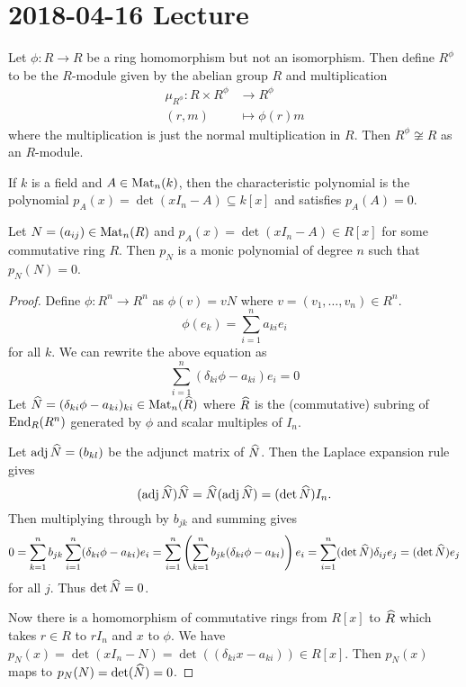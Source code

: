 \section{2018-04-16 Lecture}

\begin{exam}
	Let $\phi:R \to R$ be a ring homomorphism but not an isomorphism.
	Then define $R^\phi$ to be the $R$-module given by the abelian group $R$ and multiplication
	\begin{align*}
		\mu_{R^\phi}: R \times R^\phi &\to R^\phi \\
		(r,m) &\mapsto \phi(r)m
	\end{align*}
	where the multiplication is just the normal multiplication in $R$.
	Then $R^\phi \not\cong R$ as an $R$-module.
\end{exam}

If $k$ is a field and $A \in \operatorname{Mat}_n(k)$, then the characteristic polynomial is the polynomial $p_A(x) = \det(xI_n-A) \subseteq k[x]$ and satisfies $p_A(A)=0$.

\begin{thm}
	Let $N = (a_{ij}) \in \operatorname{Mat}_n(R)$ and $p_A(x) = \det(xI_n-A) \in R[x]$ for some commutative ring $R$.
	Then $p_N$ is a monic polynomial of degree $n$ such that $p_N(N)=0$.
\end{thm}

\begin{proof}
	Define $\phi: R^n \to R^n$ as $\phi(v)=vN$ where $v=(v_1,\ldots,v_n) \in R^n$.
	\[\phi(e_k) = \sum_{i=1}^n a_{ki}e_i\]
	for all $k$.
	We can rewrite the above equation as
	\[\sum_{i=1}^n (\delta_{ki}\phi-a_{ki})e_i=0\]
	Let $\widehat{N}=(\delta_{ki}\phi-a_{ki})_{ki} \in \operatorname{Mat}_n(\widehat R)$ where $\widehat R$ is the (commutative) subring of $\operatorname{End}_R(R^n)$ generated by $\phi$ and scalar multiples of $I_n$.

	Let $\operatorname{adj} \widehat N = (b_{kl})$ be the adjunct matrix of $\widehat N$.
	Then the Laplace expansion rule gives
	\[ (\operatorname{adj}\widehat N)\widehat N = \widehat N(\operatorname{adj}\widehat N) = (\det\widehat N) I_n.\]
	Then multiplying through by $b_{jk}$ and summing gives
	\[0 = \sum_{k=1}^n b_{jk} \sum_{i=1}^n (\delta_{ki}\phi-a_{ki})e_i = \sum_{i=1}^n \left( \sum_{k=1}^n b_{jk}(\delta_{ki}\phi-a_{ki})\right)e_i = \sum_{i=1}^n (\det \widehat N)\delta_{ij} e_j = (\det \widehat N)e_j\]
	for all $j$.
	Thus $\det \widehat N=0$.
	
	Now there is a homomorphism of commutative rings from $R[x]$ to $\widehat R$ which takes $r \in R$ to $rI_n$ and $x$ to $\phi$.
	We have $p_N(x) = \det(xI_n-N) = \det( (\delta_{ki}x-a_{ki}) ) \in R[x]$.
	Then $p_N(x)$ maps to $p_N(N) = \det (\widehat N) = 0$.
\end{proof}

